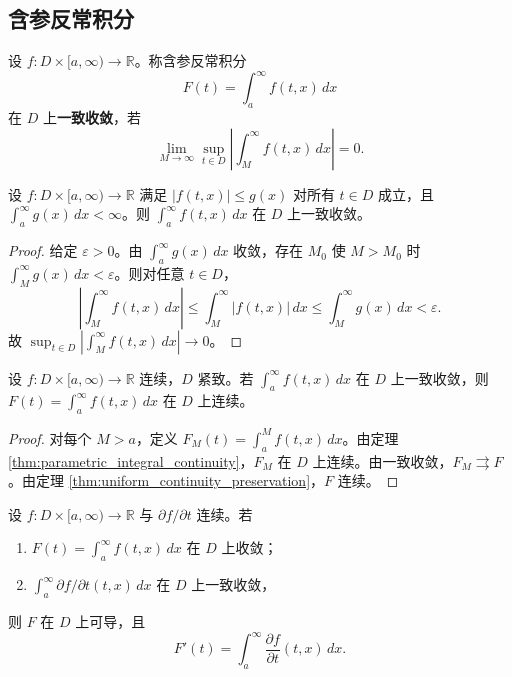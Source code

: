 \subsection{含参反常积分}

\begin{definition}[含参反常积分的一致收敛]\label{def:uniform_improper_integral}
设 $f: D \times [a, \infty) \to \mathbb{R}$。称含参反常积分
\[
F(t) = \int_a^{\infty} f(t, x) \, dx
\]
在 $D$ 上\textbf{一致收敛}，若
\[
\lim_{M \to \infty} \sup_{t \in D} \left| \int_M^{\infty} f(t, x) \, dx \right| = 0.
\]
\end{definition}

\begin{theorem}\label{thm:improper_m_test}
设 $f: D \times [a, \infty) \to \mathbb{R}$ 满足 $|f(t, x)| \le g(x)$ 对所有 $t \in D$ 成立，且 $\int_a^{\infty} g(x) \, dx < \infty$。则 $\int_a^{\infty} f(t, x) \, dx$ 在 $D$ 上一致收敛。
\end{theorem}

\begin{proof}
给定 $\varepsilon > 0$。由 $\int_a^{\infty} g(x) \, dx$ 收敛，存在 $M_0$ 使 $M > M_0$ 时 $\int_M^{\infty} g(x) \, dx < \varepsilon$。则对任意 $t \in D$，
\[
\left| \int_M^{\infty} f(t, x) \, dx \right| \le \int_M^{\infty} |f(t, x)| \, dx \le \int_M^{\infty} g(x) \, dx < \varepsilon.
\]
故 $\sup_{t \in D} |\int_M^{\infty} f(t, x) \, dx| \to 0$。
\end{proof}

\begin{theorem}[含参反常积分的连续性]\label{thm:improper_integral_continuity}
设 $f: D \times [a, \infty) \to \mathbb{R}$ 连续，$D$ 紧致。若 $\int_a^{\infty} f(t, x) \, dx$ 在 $D$ 上一致收敛，则 $F(t) = \int_a^{\infty} f(t, x) \, dx$ 在 $D$ 上连续。
\end{theorem}

\begin{proof}
对每个 $M > a$，定义 $F_M(t) = \int_a^M f(t, x) \, dx$。由定理 \ref{thm:parametric_integral_continuity}，$F_M$ 在 $D$ 上连续。由一致收敛，$F_M \rightrightarrows F$。由定理 \ref{thm:uniform_continuity_preservation}，$F$ 连续。
\end{proof}

\begin{theorem}[含参反常积分的积分号下求导]\label{thm:improper_leibniz_rule}
设 $f: D \times [a, \infty) \to \mathbb{R}$ 与 $\partial f/\partial t$ 连续。若
\begin{enumerate}[label=(\roman*)]
    \item $F(t) = \int_a^{\infty} f(t, x) \, dx$ 在 $D$ 上收敛；
    \item $\int_a^{\infty} \partial f/\partial t(t, x) \, dx$ 在 $D$ 上一致收敛，
\end{enumerate}
则 $F$ 在 $D$ 上可导，且
\[
F'(t) = \int_a^{\infty} \frac{\partial f}{\partial t}(t, x) \, dx.
\]
\end{theorem}

